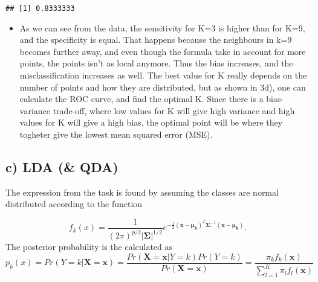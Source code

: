 \documentclass[]{article}
\providecommand{\tightlist}{%
  \setlength{\itemsep}{0pt}\setlength{\parskip}{0pt}}
\begin{document}
\begin{verbatim}
## [1] 0.8333333
\end{verbatim}

\begin{itemize}
\tightlist
\item
  As we can see from the data, the sensitivity for K=3 is higher than
  for K=9, and the specificity is equal. That happens because the
  neighbours in k=9 becomes further away, and even though the formula
  take in account for more points, the points isn't as local anymore.
  Thus the bias increases, and the misclassification increases as well.
  The best value for K really depends on the number of points and how
  they are distributed, but as shown in 3d), one can calculate the ROC
  curve, and find the optimal K. Since there is a bias-variance
  trade-off, where low values for K will give high variance and high
  values for K will give a high bias, the optimal point will be where
  they togheter give the lowest mean squared error (MSE).
\end{itemize}

\subsection{c) LDA (\& QDA)}\label{c-lda-qda}

The expression from the task is found by assuming the classes are normal
distributed according to the function

\[f_k(x)=\frac{1}{(2\pi)^{p/2}|\boldsymbol{\Sigma}|^{1/2}}e^{-\frac{1}{2} (\boldsymbol{x}-\boldsymbol{\mu_k})^T\boldsymbol{\Sigma}^{-1}(\boldsymbol{x}-\boldsymbol{\mu_k})}.\]
The posterior probability is the calculated as
\[p_k(x)=Pr(Y=k|\boldsymbol{X}=\boldsymbol{x})=\frac{Pr(\boldsymbol{X}=\boldsymbol{x}|Y=k)Pr(Y=k)}{Pr(\boldsymbol{X}=\boldsymbol{x})}=\frac{\pi_kf_k(\boldsymbol{x})}{\sum_{l=1}^K\pi_lf_l(\boldsymbol{x})}\]
\end{document}
